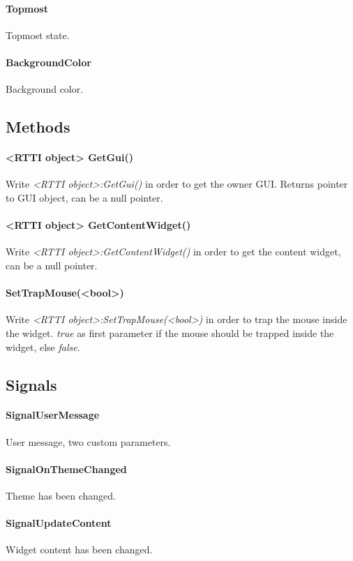 \paragraph{Topmost}
Topmost state.

\paragraph{BackgroundColor}
Background color.


\subsection{Methods}

\paragraph{<RTTI object> GetGui()}
Write \emph{<RTTI object>:GetGui()} in order to get the owner GUI. Returns pointer to GUI object, can be a null pointer.

\paragraph{<RTTI object> GetContentWidget()}
Write \emph{<RTTI object>:GetContentWidget()} in order to get the content widget, can be a null pointer.

\paragraph{SetTrapMouse(<bool>)}
Write \emph{<RTTI object>:SetTrapMouse(<bool>)} in order to trap the mouse inside the widget. \emph{true} as first parameter if the mouse should be trapped inside the widget, else \emph{false}.


\subsection{Signals}

\paragraph{SignalUserMessage}
User message, two custom parameters.

\paragraph{SignalOnThemeChanged}
Theme has been changed.

\paragraph{SignalUpdateContent}
Widget content has been changed.

